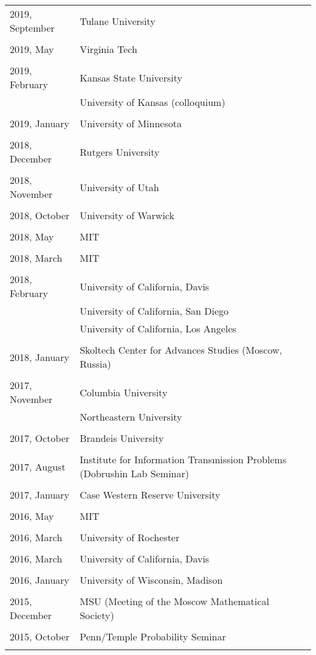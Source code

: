 \documentclass[letterpaper,11pt]{article}
\begin{document}
\begin{longtable}{llc}
	2019, September
	& Tulane University
	\\\\
	2019, May
	& Virginia Tech
	\\\\
	2019, February
	& Kansas State University \\
	& University of Kansas (colloquium)
	\\\\
	2019, January
	& University of Minnesota
	\\\\
	2018, December
	& Rutgers University
	\\\\
	2018, November
	& University of Utah
	\\\\
	2018, October
	& University of Warwick
	\\\\
	2018, May
	& MIT
	\\\\
	2018, March
	& MIT
	\\\\
	2018, February 
	& University of California, Davis
	\\
	& University of California, San Diego
	\\
	& University of California, Los Angeles
	\\\\
	2018, January
	& Skoltech Center for Advances Studies (Moscow, Russia)
	\\\\
	2017, November
	& Columbia University
	\\
	& Northeastern University
	\\\\
	2017, October
	& Brandeis University
	\\\\
	2017, August
	& Institute for Information Transmission Problems
	(Dobrushin Lab Seminar)
	\\\\
	2017, January
	& Case Western Reserve University
	\\\\
	2016, May
	& MIT
	\\\\
	2016, March
	& University of Rochester
	\\\\
	2016, March
	& University of California, Davis
	\\\\
	2016, January
	& University of Wisconsin, Madison
	\\\\
	2015, December
	& MSU (Meeting of the Moscow Mathematical Society)
	\\\\
	2015, October
	& Penn/Temple Probability Seminar
	\\\\


\end{longtable}
\end{document}
